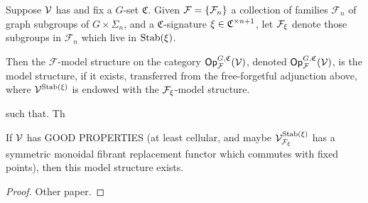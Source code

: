 \documentclass[psamsfonts,oneside,10pt,letterpaper
,draft
]{amsart}%
\renewcommand{\F}{\mathcal F}
\renewcommand{\H}{\ensuremath{\mathbb{H}}}
\renewcommand{\1}{\ensuremath{\mathbb{id}}}
\begin{document}
\begin{definition}
      Suppose $\mathcal V$ has
      and fix a $G$-set $\mathfrak C$.
      Given $\F = \set{\F_n}$ a collection of families $\F_n$ of graph subgroups of $G \times \Sigma_n$,
      and a $\mathfrak C$-signature $\xi \in \mathfrak C^{\times n+1}$,
      let $\F_\ksi$ denote those subgroups in $\F_n$ which live in $\mathrm{Stab}(\xi)$.

      Then the $\F$-model structure on the category $\Op^{G,\mathfrak C}_\F(\V)$, denoted $\Op^{G,\mathfrak C}_\F(\V)$,
      is the model structure, if it exists, transferred from the free-forgetful adjunction above,
      where $\mathcal V^{\mathrm{Stab}(\xi)}$ is endowed with the $\F_\ksi$-model structure.
      
      such that. Th
\end{definition}
\begin{proposition}
      If $\mathcal V$ has {\color{red} GOOD PROPERTIES}
      (at least cellular, and maybe
      $\V^{\Stab(\ksi)}_{\F_\ksi}$ has a symmetric monoidal fibrant replacement functor which commutes with fixed points),
      then this model structure exists.
\end{proposition}
\begin{proof}
      Other paper.
\end{proof}
\end{document}
